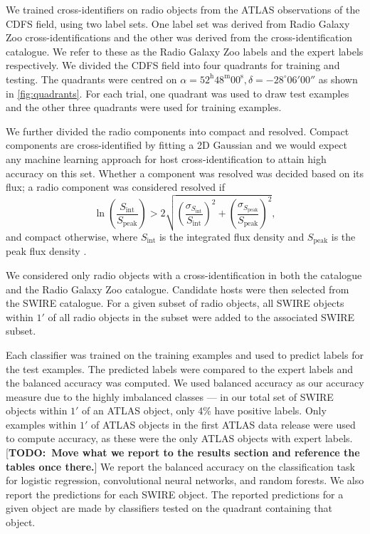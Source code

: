 \documentclass[fleqn,usenatbib,usedcolumn]{mnras}
\newcommand{\text}{\mathrm}
\newcommand{\todo}[1]{ {\color{red}[{\bf TODO:~{#1}}]} }
\begin{document}
    We trained cross-identifiers on radio objects from the ATLAS observations of
    the CDFS field, using two label sets. One label set was derived from Radio
    Galaxy Zoo cross-identifications and the other was derived from the
    \citet{norris06} cross-identification catalogue. We refer to these as the
    Radio Galaxy Zoo labels and the expert labels respectively. We divided the
    CDFS field into four quadrants for training and testing. The quadrants were
    centred on $\alpha = 52^\text{h}48^\text{m}00^\text{s},
    \delta = -28^\circ{}06'00''$ as shown in \autoref{fig:quadrants}. For
    each trial, one quadrant was used to draw test examples and the other three
    quadrants were used for training examples.

    We further divided the radio components into compact and resolved. Compact
    components are cross-identified by fitting a 2D Gaussian \citep[as
    in][]{norris06} and we would expect any machine learning approach for host
    cross-identification to attain high accuracy on this set. Whether a
    component was resolved was decided based on its flux; a radio component was
    considered resolved if
    \begin{equation}
        \ln \left(
          \frac{S_{\text{int}}}
               {S_{\text{peak}}}
        \right) > 2\sqrt{\left(
          \frac{\sigma_{S_{\text{int}}}}
               {S_{\text{int}}}
        \right)^2 + \left(
          \frac{\sigma_{S_{\text{peak}}}}
               {S_{\text{peak}}}
        \right)^2},
    \end{equation}%
    and compact otherwise, where \(S_{\text{int}}\) is the integrated flux
    density and \(S_{\text{peak}}\) is the peak flux density
    \citep{franzen15}.

    We considered only radio objects with a cross-identification in both the
    \citet{norris06} catalogue and the Radio Galaxy Zoo catalogue. Candidate
    hosts were then selected from the SWIRE catalogue. For a given subset of
    radio objects, all SWIRE objects within $1'$ of all radio objects in the
    subset were added to the associated SWIRE subset.

    Each classifier was trained on the training examples and used to predict
    labels for the test examples. The predicted labels were compared to the
    expert labels and the balanced accuracy was computed. We used balanced
    accuracy as our accuracy measure due to the highly imbalanced classes --- in
    our total set of SWIRE objects within $1'$ of an ATLAS object, only 4\% have
    positive labels. Only examples within $1'$ of ATLAS objects in the first
    ATLAS data release \citep{norris06} were used to compute accuracy, as these
    were the only ATLAS objects with expert labels. \todo{Move what we report to
    the results section and reference the tables once there.} We report the
    balanced accuracy on the classification task for logistic regression,
    convolutional neural networks, and random forests. We also report the
    predictions for each SWIRE object. The reported predictions for a given
    object are made by classifiers tested on the quadrant containing that
    object.
\end{document}

